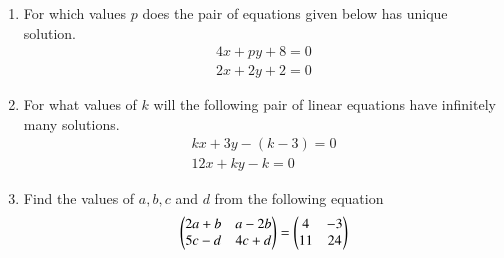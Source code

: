 \begin{enumerate}[label=\thesubsection.\arabic*,ref=\thesubsection.\theenumi]
\item For which values $p$ does the pair of equations given below has unique solution.
\begin{align}
4x+py+8 = 0 \\ 2x+2y+2 = 0
\end{align}
\item For what values of $k$ will the following pair of linear equations have infinitely many solutions.
\begin{align}
kx+3y-(k-3) = 0 \\ 12x+ky-k = 0
\end{align}
\item Find the values of $a, b, c$ and $d$ from the following equation 
\begin{align} 
\begin{pmatrix}2a+b&a-2b\\5c-d&4c+d\end{pmatrix} = \begin{pmatrix}4&-3\\11&24\end{pmatrix} 
\end{align}
\end{enumerate}

